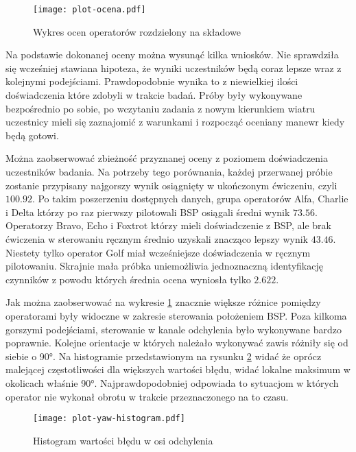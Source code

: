 \begin{figure}[!h]
    \centering \texttt{[image: plot-ocena.pdf]}
    \caption{Wykres ocen operatorów rozdzielony na składowe}
    \label{fig:plot-ocena}
\end{figure}

Na podstawie dokonanej oceny można wysunąć kilka wniosków. Nie sprawdziła się wcześniej stawiana hipoteza, że wyniki uczestników będą coraz lepsze wraz z kolejnymi podejściami. Prawdopodobnie wynika to z niewielkiej ilości doświadczenia które zdobyli w trakcie badań. Próby były wykonywane bezpośrednio po sobie, po wczytaniu zadania z nowym kierunkiem wiatru uczestnicy mieli się zaznajomić z warunkami i rozpocząć oceniany manewr kiedy będą gotowi.

Można zaobserwować zbieżność przyznanej oceny z poziomem doświadczenia uczestników badania. Na potrzeby tego porównania, każdej przerwanej próbie zostanie przypisany najgorszy wynik osiągnięty w ukończonym ćwiczeniu, czyli $ 100.92 $. Po takim poszerzeniu dostępnych danych, grupa operatorów Alfa, Charlie i Delta którzy po raz pierwszy pilotowali BSP osiągali średni wynik $ 73.56 $. Operatorzy Bravo, Echo i Foxtrot którzy mieli doświadczenie z BSP, ale brak ćwiczenia w sterowaniu ręcznym średnio uzyskali znacząco lepszy wynik $ 43.46 $. Niestety tylko operator Golf miał wcześniejsze doświadczenia w ręcznym pilotowaniu. Skrajnie mała próbka uniemożliwia jednoznaczną identyfikację czynników z powodu których średnia ocena wyniosła tylko $ 2.622 $.

Jak można zaobserwować na wykresie \ref{fig:plot-ocena} znacznie większe różnice pomiędzy operatorami były widoczne w zakresie sterowania położeniem BSP. Poza kilkoma gorszymi podejściami, sterowanie w kanale odchylenia było wykonywane bardzo poprawnie. Kolejne orientacje w których należało wykonywać zawis różniły się od siebie o 90°. Na histogramie przedstawionym na rysunku \ref{fig:plot-yaw-histogram} widać że oprócz malejącej częstotliwości dla większych wartości błędu, widać lokalne maksimum w okolicach właśnie 90°. Najprawdopodobniej odpowiada to sytuacjom w których operator nie wykonał obrotu w trakcie przeznaczonego na to czasu.

\begin{figure}[!h]
    \centering \texttt{[image: plot-yaw-histogram.pdf]}
    \caption{Histogram wartości błędu w osi odchylenia}
    \label{fig:plot-yaw-histogram}
\end{figure}

